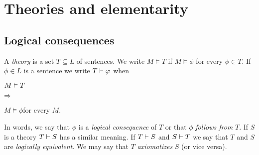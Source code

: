 \documentclass[creche.tex]{subfiles}
\begin{document}
\chapter{Theories and elementarity}
\label{teorie}

\def\medrel#1{\parbox[t]{6ex}{$\displaystyle\hfil #1$}}
\def\ceq#1#2#3{\parbox{15ex}{$\displaystyle #1$}\medrel{#2}$\displaystyle  #3$}

\section{Logical consequences}\label{conseguenzelogiche}
% 
% 
% 
% 
% 
% 


A \emph{theory\/} is a set $T\subseteq L$ of sentences.
We write \emph{$M\models T$\/} if $M\models\phi$ for every $\phi\in T$.
If $\phi\in L$ is a sentence we write \emph{$T\vdash\varphi$\/} when

\ceq{\hfill M\models T}{\IMP}{M\models\phi}\qquad for every $M$.

In words, we say that $\phi$ is a \emph{logical consequence\/} of $T$ or that $\phi$ \emph{follows from\/} $T$.
If $S$ is a theory \emph{$T\vdash S$\/} has a similar meaning.
If $T\vdash S$ and $S\vdash T$ we say that $T$ and $S$ are \emph{logically equivalent}.
We may say that $T$ \emph{axiomatizes\/} $S$ (or vice versa).
\end{document}
